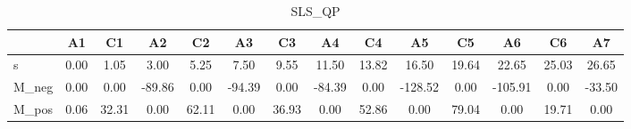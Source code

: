 \begin{table}[H]
\caption{SLS_QP}
\begin{tabular}{lSSSSSSSSSSSSS}
\toprule
{} & {A1} & {C1} & {A2} & {C2} & {A3} & {C3} & {A4} & {C4} & {A5} & {C5} & {A6} & {C6} & {A7} \\
\midrule
s & 0.00 & 1.05 & 3.00 & 5.25 & 7.50 & 9.55 & 11.50 & 13.82 & 16.50 & 19.64 & 22.65 & 25.03 & 26.65 \\
M_neg & 0.00 & 0.00 & -89.86 & 0.00 & -94.39 & 0.00 & -84.39 & 0.00 & -128.52 & 0.00 & -105.91 & 0.00 & -33.50 \\
M_pos & 0.06 & 32.31 & 0.00 & 62.11 & 0.00 & 36.93 & 0.00 & 52.86 & 0.00 & 79.04 & 0.00 & 19.71 & 0.00 \\
\bottomrule
\end{tabular}
\end{table}
